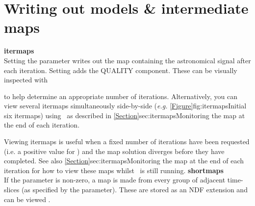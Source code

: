 \section{Writing out models \& intermediate maps}
\label{sec:inter}

\textbf{itermaps}\\
Setting the parameter  writes out the
map containing the astronomical signal after each iteration. Setting
 adds the QUALITY component.  These can be visually
inspected with

\begin{terminalv}
\end{terminalv}

to help determine an appropriate number of iterations. Alternatively, you
can view several itermaps simultaneously side-by-side (\emph{e.g.}
\cref{Figure}{fig:itermaps}{Initial six itermaps}) using \Kappa\ as
described in \cref{Section}{sec:itermaps}{Monitoring the map at the
end of each iteration}.

Viewing itermaps is useful when a fixed number of iterations have been requested (i.e. a positive
value for ) and the map solution diverges before
they have completed. See also \cref{Section}{sec:itermaps}{Monitoring the map
at the end of each iteration} for how to view these maps whilst \makemap\ is still running.
\newline\newline
\textbf{shortmaps}\\
If the parameter  is non-zero, a map is made from
every group of adjacent time-slices (as specified by the parameter).
These are stored as an NDF extension and can be viewed \gaia.

